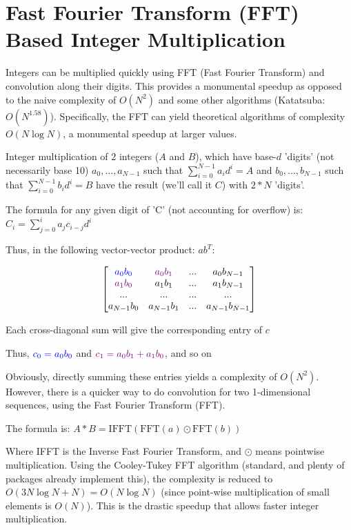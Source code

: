\documentclass[a4paper,11pt]{article}
\theoremstyle{mytheor}
\begin{document}
\section{Fast Fourier Transform (FFT) Based Integer Multiplication}\label{sec:mult}

Integers can be multiplied quickly using FFT (Fast Fourier Transform) and convolution along their digits. This provides a monumental speedup as opposed to the naive complexity of $O(N^2)$ and some other algorithms (Katatsuba: $O(N^{1.58})$). Specifically, the FFT can yield theoretical algorithms of complexity $O(N \log N)$, a monumental speedup at larger values.

Integer multiplication of 2 integers ($A$ and $B$), which have base-$d$ 'digits' (not necessarily base 10) $a_0, ..., a_{N-1}$ such that $\sum_{i=0}^{N-1} a_i d^i = A$ and $b_0, ..., b_{N-1}$ such that $\sum_{i=0}^{N-1} b_i d^i = B$ have the result (we'll call it $C$) with $2*N$ 'digits'.

The formula for any given digit of 'C' (not accounting for overflow) is: $C_i=\sum_{j=0}^{i} a_{j}c_{i-j}d^{i}$

Thus, in the following vector-vector product: $ab^T$:
\newcommand\GREEN{\color{violet}}
\newcommand\BLUE{\color{blue}}

$$ \begin{bmatrix}
\BLUE a_0 b_0 & \GREEN a_0 b_1 & ... & a_0 b_{N-1} \\
\GREEN a_1 b_0 & a_1 b_1 & ... & a_1 b_{N-1} \\
... & ... & ... & ... \\
a_{N-1} b_0 & a_{N-1} b_1 & ... & a_{N-1} b_{N-1} \\
\end{bmatrix} $$


Each cross-diagonal sum will give the corresponding entry of $c$

Thus, $\BLUE c_0 = a_0 b_0$ and $\GREEN c_1 = a_0 b_1 + a_1 b_0$, and so on

Obviously, directly summing these entries yields a complexity of $O(N^2)$. However, there is a quicker way to do convolution for two 1-dimensional sequences, using the Fast Fourier Transform (FFT).

The formula is: $A*B=\textrm{IFFT}(\textrm{FFT}(a) \odot \textrm{FFT}(b))$

Where IFFT is the Inverse Fast Fourier Transform, and $\odot$ means pointwise multiplication. Using the Cooley-Tukey FFT algorithm (standard, and plenty of packages already implement this), the complexity is reduced to $O(3N \log N + N) = O(N \log N)$ (since point-wise multiplication of small elements is $O(N)$). This is the drastic speedup that allows faster integer multiplication.
\end{document}
